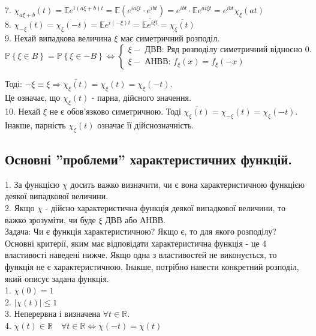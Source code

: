 7. $\chi_{a \xi +b} (t) = \mathbb{E} e^{i(a \xi + b)t}  = \mathbb{E} ( e^{ ia \xi t} \cdot e^{ibt}) = e^{ibt} \cdot \mathbb{E} e^{ai \xi t} = e^{ibt} \chi_{\xi} (at) $\\
8. $\chi_{-\xi}(t) = \chi_{\xi} (-t) = \mathbb{E} e^{i(-\xi)t} =  \overline{ \mathbb{E} e^{i \xi t}} = \overline{\chi_{\xi} (t)}$\\
9. Нехай випадкова величина $\xi$ має симетричний розподіл.
$$
\mathbb{P} \left\lbrace \xi \in B \right\rbrace = \mathbb{P} \left\lbrace \xi\in -B \right\rbrace \Leftrightarrow \begin{cases}
\xi - \text{ ДВВ: Ряд розподілу симетричний відносно 0.} \\
 \xi - \text{ АНВВ: } f_{\xi}(x) = f_{\xi}(-x)
\end{cases}
$$

\def\char{\chi_{\xi}}
Тоді: $- \xi \equiv \xi  \Longrightarrow \overline{\char(t)} = \char(t) = \char(-t)$.\\
Це означає, що $\char (t)$ - парна, дійсного значення.\\
10. Нехай $\xi$ не є обов'язково симетричною. Тоді $\overline{\char(t)} = \chi_{-\xi}(t) = \char(-t)$. \\Інакше, парність $\char (t)$ означає її дійснозначність.
\newpage
\subsection{Основні ''проблеми'' характеристичних функцій.}
1. За функцією $\chi$ досить важко визначити, чи є вона характеристичною функцією деякої випадкової величини.\\
2. Якщо $\chi$ - дійсно характеристична функція деякої випадкової величини, то важко зрозуміти, чи буде $\xi$ ДВВ або АНВВ.\\

Задача: Чи є функція характеристичною? Якщо є, то для якого розподілу?\\
Основні критерії, яким має відповідати характеристична функція - це 4 властивості наведені нижче. Якщо одна з властивостей не виконується, то функція не є характеристичною. Інакше, потрібно навести конкретний розподіл, який описує задана функція.\\
1. $\chi(0) = 1$\\
2. $ \left| \chi(t) \right| \leq 1 	$\\
3. Неперервна і визначена $\forall t \in \mathbb{R}$.\\
4. $\chi (t) \in \mathbb{R} \quad \forall t \in \mathbb{R} \Longleftrightarrow
\chi(-t) = \chi (t)
$\\

